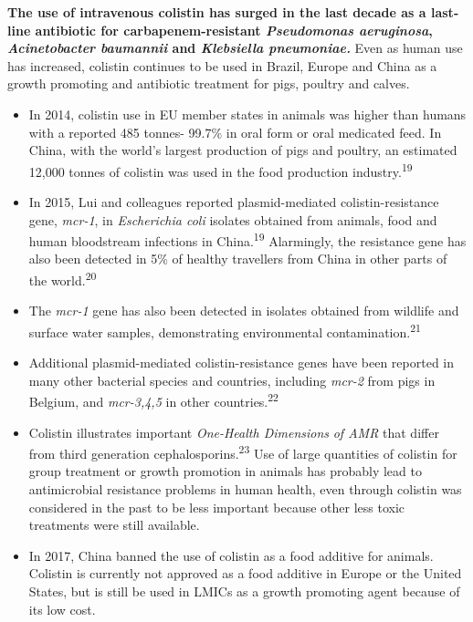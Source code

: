\documentclass[
  11pt,
  paper=a4,
  ,captions=tableheading
]{scrartcl}
\begin{document}
\textbf{The use of intravenous colistin has surged in the last decade as
a last-line antibiotic for carbapenem-resistant \emph{Pseudomonas
aeruginosa}, \emph{Acinetobacter baumannii} and \emph{Klebsiella
pneumoniae.}} Even as human use has increased, colistin continues to be
used in Brazil, Europe and China as a growth promoting and antibiotic
treatment for pigs, poultry and calves.

\begin{itemize}
\item
  In 2014, colistin use in EU member states in animals was higher than
  humans with a reported 485 tonnes- 99.7\% in oral form or oral
  medicated feed. In China, with the world's largest production of pigs
  and poultry, an estimated 12,000 tonnes of colistin was used in the
  food production industry.\textsuperscript{19}
\item
  In 2015, Lui and colleagues reported plasmid-mediated
  colistin-resistance gene, \emph{mcr-1}, in \emph{Escherichia coli}
  isolates obtained from animals, food and human bloodstream infections
  in China.\textsuperscript{19} Alarmingly, the resistance gene has also
  been detected in 5\% of healthy travellers from China in other parts
  of the world.\textsuperscript{20}
\item
  The \emph{mcr-1} gene has also been detected in isolates obtained from
  wildlife and surface water samples, demonstrating environmental
  contamination.\textsuperscript{21}
\item
  Additional plasmid-mediated colistin-resistance genes have been
  reported in many other bacterial species and countries, including
  \emph{mcr-2} from pigs in Belgium, and \emph{mcr-3,4,5} in other
  countries.\textsuperscript{22}
\item
  Colistin illustrates important \emph{One-Health Dimensions} \emph{of
  AMR} that differ from third generation
  cephalosporins.\textsuperscript{23} Use of large quantities of
  colistin for group treatment or growth promotion in animals has
  probably lead to antimicrobial resistance problems in human health,
  even through colistin was considered in the past to be less important
  because other less toxic treatments were still available.
\item
  In 2017, China banned the use of colistin as a food additive for
  animals. Colistin is currently not approved as a food additive in
  Europe or the United States, but is still be used in LMICs as a growth
  promoting agent because of its low cost.
\end{itemize}
\end{document}
